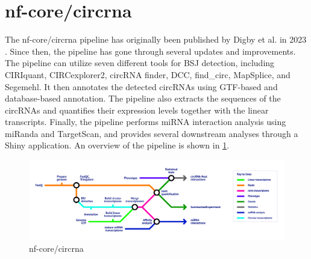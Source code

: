 \section{nf-core/circrna}
\label{sec:nf-core_circrna}
The nf-core/circrna pipeline has originally been published by Digby et al.
in
2023 \supercite{digby_nf-corecircrna_2023}.
Since then, the pipeline has gone through several updates and improvements.
The pipeline can utilize seven different tools for BSJ detection, including
CIRIquant, CIRCexplorer2, circRNA finder, DCC, find\_circ, MapSplice, and
Segemehl.
It then annotates the detected circRNAs using GTF-based and database-based
annotation.
The pipeline also extracts the sequences of the circRNAs and quantifies their
expression levels together with the linear transcripts.
Finally, the pipeline performs miRNA interaction analysis using miRanda and
TargetScan, and provides several downstream analyses through a Shiny
application.
An overview of the pipeline is shown in \cref{fig:circrna_pipeline}.

\begin{figure}[ht]
    \centering

    \includegraphics[width=\textwidth]{chapters/3_materials_and_methods/figures/nf-core_circrna.png}
    \caption{nf-core/circrna} %
    \label{fig:circrna_pipeline}
\end{figure}






